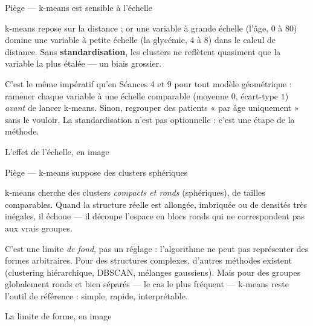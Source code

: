 \documentclass[aspectratio=169,11pt]{beamer}
\begin{document}
\begin{frame}{Piège — k-means est sensible à l'échelle}
\begin{ucadpiege}
{\small k-means repose sur la distance ; or une variable à grande échelle (l'âge, $0$ à $80$) domine une variable à petite échelle (la glycémie, $4$ à $8$) dans le calcul de distance. Sans \textbf{standardisation}, les clusters ne reflètent quasiment que la variable la plus étalée — un biais grossier.}
\end{ucadpiege}
{\small C'est le même impératif qu'en Séances 4 et 9 pour tout modèle géométrique : ramener chaque variable à une échelle comparable (moyenne $0$, écart-type $1$) \emph{avant} de lancer k-means. Sinon, regrouper des patients « par âge uniquement » sans le vouloir. La standardisation n'est pas optionnelle : c'est une étape de la méthode.}
\end{frame}

\begin{frame}{L'effet de l'échelle, en image}
\end{frame}

\begin{frame}{Piège — k-means suppose des clusters sphériques}
\begin{ucadpiege}
{\small k-means cherche des clusters \emph{compacts et ronds} (sphériques), de tailles comparables. Quand la structure réelle est allongée, imbriquée ou de densités très inégales, il échoue — il découpe l'espace en blocs ronds qui ne correspondent pas aux vrais groupes.}
\end{ucadpiege}
{\small C'est une limite \emph{de fond}, pas un réglage : l'algorithme ne peut pas représenter des formes arbitraires. Pour des structures complexes, d'autres méthodes existent (clustering hiérarchique, DBSCAN, mélanges gaussiens). Mais pour des groupes globalement ronds et bien séparés — le cas le plus fréquent — k-means reste l'outil de référence : simple, rapide, interprétable.}
\end{frame}

\begin{frame}{La limite de forme, en image}
\end{frame}
\end{document}
